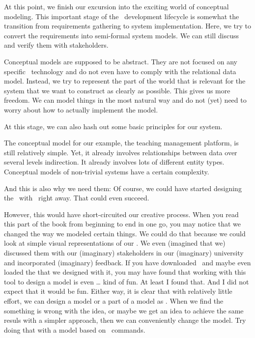 %
%
At this point, we finish our excursion into the exciting world of conceptual modeling.
This important stage of the \db\ development lifecycle is somewhat the transition from requirements gathering to system implementation.
Here, we try to convert the requirements into semi-formal system models.
We can still discuss and verify them with stakeholders.

Conceptual models are supposed to be abstract.
They are not focused on any specific \db\ technology and do not even have to comply with the relational data model.
Instead, we try to represent the part of the world that is relevant for the system that we want to construct as clearly as possible.
This gives us more freedom.
We can model things in the most natural way and do not (yet) need to worry about how to actually implement the model.

At this stage, we can also hash out some basic principles for our system.


The conceptual model for our example, the teaching management platform, is still relatively simple.
Yet, it already involves relationships between data over several levels indirection.
It already involves lots of different entity types.
Conceptual models of non-trivial systems have a certain complexity.

And this is also why we need them:
Of course, we could have started designing the \db\ with \sql\ right away.
That could even succeed.

However, this would have short-circuited our creative process.
When you read this part of the book from beginning to end in one go, you may notice that we changed the way we modeled certain things.
We could do that because we could look at simple visual representations of our \db.
We even (imagined that we) discussed them with our (imaginary) stakeholders in our (imaginary) university and incorporated (imaginary) feedback.
If you have downloaded \yEd\ and maybe even loaded the  that we designed with it, you may have found that working with this tool to design a model is even {\dots} kind of fun.
At least I found that.
And I did not expect that it would be fun.
Either way, it is clear that with relatively little effort, we can design a model or a part of a model as .
When we find the something is wrong with the idea, or maybe we get an idea to achieve the same resuls with a simpler approach, then we can conveniently change the model.
Try doing that with a model based on \sql\ commands.%
%
\endhsection%
%

